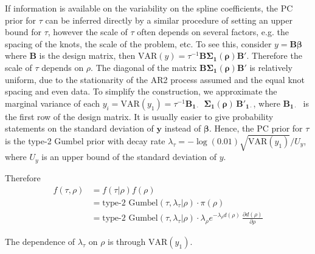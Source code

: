 \documentclass[12pt,a4paper]{article}
\begin{document}
If information is available on the variability on the spline coefficients, the PC prior for $\tau$ can be inferred directly by a similar procedure of setting an upper bound for $\tau$, however the scale of $\tau$ often depends on several factors, e.g. the spacing of the knots, the scale of the problem, etc. To see this, consider $y = \boldsymbol{B\beta}$ where $\boldsymbol{B}$ is the design matrix, then $\text{VAR}(y) = \tau^{-1}\boldsymbol{B \Sigma_1(\rho) B'}$. Therefore the scale of $\tau$ depends on $\rho$. The diagonal of the matrix $\boldsymbol{B \Sigma_1(\rho) B'}$ is relatively uniform, due to the stationarity of the AR2 process assumed and the equal knot spacing and even data. To simplify the construction, we approximate the marginal variance of each $y_i = \text{VAR}(y_1) = \tau^{-1} \boldsymbol{B_{1\cdot}\phantom{'} \, \Sigma_1{(\rho)} \, B'_{1\cdot}}$, where $\boldsymbol{B_{1\cdot}\phantom{'}}$ is the first row of the design matrix. It is usually easier to give probability statements on the standard deviation of $\boldsymbol{y}$ instead of $\boldsymbol{\beta}$. Hence, the PC prior for $\tau$ is the type-2 Gumbel prior with decay rate $\lambda_{\tau} = -\log(0.01) \sqrt{\text{VAR}(y_1)}/ U_{y}$, where $U_y$ is an upper bound of the standard deviation of $y$.

Therefore
\begin{align*}
f(\tau, \rho) &= f(\tau | \rho) f(\rho) \\
&= \text{type-2 Gumbel}(\tau, \lambda_{\tau}|\rho) \cdot \pi(\rho) \\
&= \text{type-2 Gumbel}(\tau, \lambda_{\tau}|\rho) \cdot  \lambda_{\rho} e^{-\lambda_{\rho} d(\rho)} \, \frac{\partial d(\rho)}{\partial \rho}
\end{align*}

The dependence of $\lambda_{\tau}$ on $\rho$ is through $\text{VAR}(y_1)$.
\end{document}
